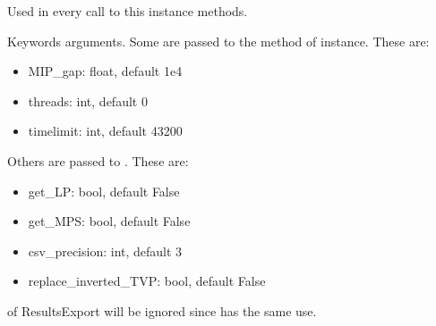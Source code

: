 \documentclass[letterpaper,10pt,english]{sphinxmanual}
\begin{document}
\begin{fulllineitems}
\begin{fulllineitems}
\label{\detokenize{generated/tamos.solve_tools.AdvSolve:tamos.solve_tools.AdvSolve.MILPModel}}
\pysigstartsignatures
{}
\pysigstopsignatures
\sphinxAtStartPar
Used in every call to this instance methods.

\end{fulllineitems}


\begin{fulllineitems}
\label{\detokenize{generated/tamos.solve_tools.AdvSolve:tamos.solve_tools.AdvSolve.kwargs}}
\pysigstartsignatures
{}
\pysigstopsignatures
\sphinxAtStartPar
Keywords arguments.
Some are passed to the  method of  instance. These are:
\begin{itemize}
\item {} 
\sphinxAtStartPar
MIP\_gap: float, default 1e\sphinxhyphen{}4

\item {} 
\sphinxAtStartPar
threads: int, default 0

\item {} 
\sphinxAtStartPar
timelimit: int, default 43200

\end{itemize}

\sphinxAtStartPar
Others are passed to . These are:
\begin{itemize}
\item {} 
\sphinxAtStartPar
get\_LP: bool, default False

\item {} 
\sphinxAtStartPar
get\_MPS: bool, default False

\item {} 
\sphinxAtStartPar
csv\_precision: int, default 3

\item {} 
\sphinxAtStartPar
replace\_inverted\_TVP: bool, default False

\end{itemize}

\sphinxAtStartPar
{} of ResultsExport will be ignored since  has the same use.


\end{fulllineitems}
\end{fulllineitems}
\end{document}
